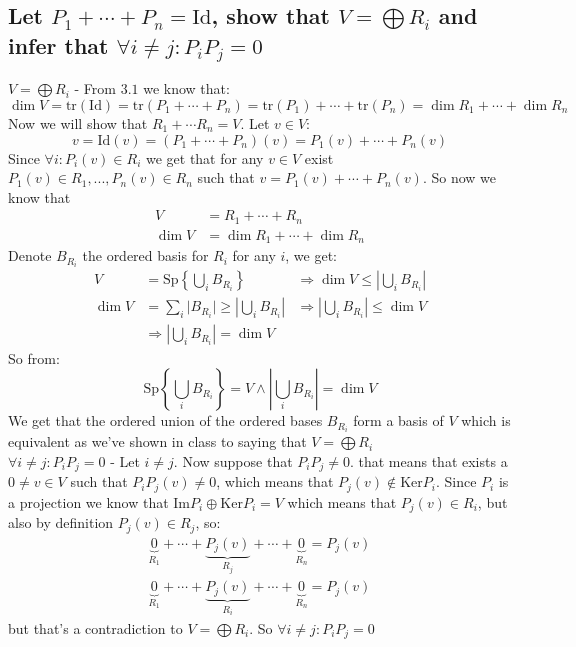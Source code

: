 \documentclass[11pt,a4paper]{article}
\theoremstyle{plain}
\newcommand{\Ker}{\text{Ker}}
\renewcommand{\Im}{\text{Im}}
\newcommand{\Sp}{\text{Sp}}
\newcommand{\tr}{\text{tr}}
\begin{document}
	\newpage
	
	\subsection{Let $P_1+\cdots+P_n = \text{Id}$, show that 
	$V = \bigoplus R_i$ and infer that $\forall i\neq j \colon P_iP_j = 0$}
	\underline{$V = \bigoplus R_i$} - From $3.1$ we know that:
	\[
		\dim V = \tr (\mathrm{Id}) = \tr (P_1+\cdots+P_n) = 
		\tr (P_1) + \cdots + \tr(P_n) = \dim R_1 + \cdots + \dim R_n
	\]
	Now we will show that $R_1+\cdots R_n = V$. Let $v\in V$:
	\[
		v = \mathrm{Id}(v) = (P_1+\cdots+P_n)(v) = P_1(v)+\cdots+P_n(v)
	\]
	Since $\forall i \colon P_i(v)\in R_i$ we get that for any $v\in V$ exist
	$P_1(v)\in R_1,...,P_n(v)\in R_n$ such that $v = P_1(v)+\cdots+P_n(v)$.
	So now we know that
	\begin{align*}
		V &= R_1 + \cdots + R_n \\
		\dim V &= \dim R_1 + \cdots + \dim R_n
	\end{align*}
	Denote $B_{R_i}$ the ordered basis for $R_i$ for any $i$, we get:
	\begin{align*}
		V &= \Sp \left\{ \bigcup_i{B_{R_i}} \right\}
		&\Rightarrow \dim V \le \left\vert \bigcup_i{B_{R_i}} \right\vert \\
		\dim V &= \sum_i{\vert B_{R_i} \vert} \ge 
		\left \vert \bigcup_i{B_{R_i}} \right \vert
		&\Rightarrow \left \vert \bigcup_i{B_{R_i}} \right \vert \le \dim V \\
		&\Rightarrow \left \vert \bigcup_i{B_{R_i}} \right \vert = \dim V
	\end{align*}
	So from:
	\[
		\Sp \left\{ \bigcup_i{B_{R_i}} \right \}   = V
		\land 
		\left \vert \bigcup_i{B_{R_i}} \right \vert = \dim V
	\]
	We get that the ordered union of the ordered bases $B_{R_i}$ form a basis
	of $V$ which is equivalent as we've shown in class to saying that 
	$V = \bigoplus R_i$ \\
	\underline{$\forall i\neq j \colon P_iP_j = 0$} - Let $i \neq j$. Now
	suppose that $P_iP_j \neq 0$. that means that exists a $0 \neq v\in V$
	such that $P_iP_j(v) \neq 0$, which means that $P_j(v) \notin \Ker P_i$.
	Since $P_i$ is a projection we know that $\Im P_i \oplus \Ker P_i = V$
	which means that $P_j(v) \in R_i$, but also by definition 
	$P_j(v) \in R_j$, so:
	\begin{align*}
		\underbrace{0}_{R_1} + \cdots + \underbrace{P_j(v)}_{R_j} + \cdots + 
		\underbrace{0}_{R_n} = P_j(v) \\
		\underbrace{0}_{R_1} + \cdots + \underbrace{P_j(v)}_{R_i} + \cdots + 
		\underbrace{0}_{R_n} = P_j(v) 
	\end{align*}
	 but that's a contradiction to $V = \bigoplus R_i$. So 
	 $\forall i\neq j \colon P_iP_j = 0$
	
\end{document}
